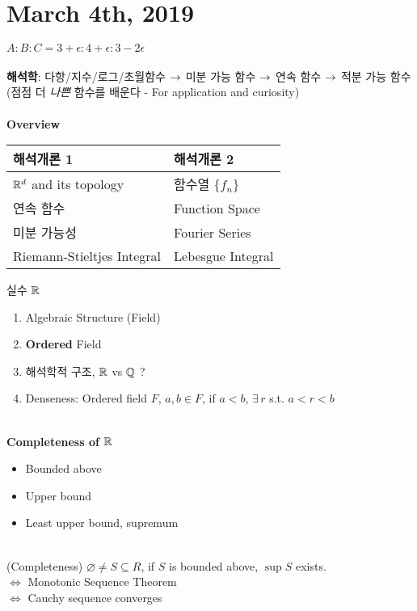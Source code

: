 \section*{March 4th, 2019}
$A:B:C = 3+\epsilon : 4 +\epsilon : 3-2\epsilon$\\\\
\textbf{해석학}:
다항/지수/로그/초월함수 $\rightarrow$ 미분 가능 함수 $\rightarrow$ 연속 함수 $\rightarrow$ 적분 가능 함수
(점점 더 \textit{나쁜} 함수를 배운다 - For application and curiosity)\\\\
\textbf{Overview}
\begin{center}
	\begin{tabular}[c]{|p{7cm}|p{7cm}|}
		\hline
		\textbf{해석개론 1} & \textbf{해석개론 2} \\ \hline
		$\mathbb{R}^d$ and its topology & 함수열 $\{f_n\}$ \\ \hline
		연속 함수 & Function Space \\ \hline
		미분 가능성 & Fourier Series \\ \hline
		Riemann-Stieltjes Integral & Lebesgue Integral \\\hline
	\end{tabular}
\end{center}
실수 $\mathbb{R}$
\begin{enumerate}
	\item Algebraic Structure (Field)
	\item \textbf{Ordered} Field
	\item 해석학적 구조, $\mathbb{R}$ vs $\mathbb{Q}$ ?
	\item Denseness: Ordered field $F$, $a, b\in F$, if $a<b$, $\exists\, r$ s.t. $a<r<b$
\end{enumerate}~\\
\textbf{Completeness of $\mathbb{R}$}
\begin{itemize}
	\item Bounded above
	\item Upper bound
	\item Least upper bound, supremum
\end{itemize}~\\
(Completeness) $\varnothing \neq S\subseteq R$, if $S$ is bounded above, $\sup S$ exists.\\
$\iff$ Monotonic Sequence Theorem\\
$\iff$ Cauchy sequence converges
\pagebreak